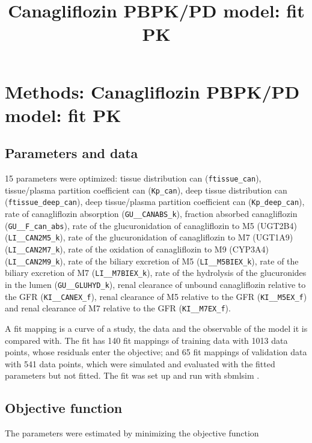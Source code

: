 \documentclass{article}
\title{Canagliflozin PBPK/PD model: fit PK}
\date{}
\begin{document}
\maketitle

\section{Methods: Canagliflozin PBPK/PD model: fit PK}

\subsection{Parameters and data}

15 parameters were optimized: tissue distribution can (\texttt{ftissue\_can}), tissue/plasma partition coefficient can (\texttt{Kp\_can}), deep tissue distribution can (\texttt{ftissue\_deep\_can}), deep tissue/plasma partition coefficient can (\texttt{Kp\_deep\_can}), rate of canagliflozin absorption (\texttt{GU\_\_CANABS\_k}), fraction absorbed canagliflozin (\texttt{GU\_\_F\_can\_abs}), rate of the glucuronidation of canagliflozin to M5 (UGT2B4) (\texttt{LI\_\_CAN2M5\_k}), rate of the glucuronidation of canagliflozin to M7 (UGT1A9) (\texttt{LI\_\_CAN2M7\_k}), rate of the oxidation of canagliflozin to M9 (CYP3A4) (\texttt{LI\_\_CAN2M9\_k}), rate of the biliary excretion of M5 (\texttt{LI\_\_M5BIEX\_k}), rate of the biliary excretion of M7 (\texttt{LI\_\_M7BIEX\_k}), rate of the hydrolysis of the glucuronides in the lumen (\texttt{GU\_\_GLUHYD\_k}), renal clearance of unbound canagliflozin relative to the GFR (\texttt{KI\_\_CANEX\_f}), renal clearance of M5 relative to the GFR (\texttt{KI\_\_M5EX\_f}) and renal clearance of M7 relative to the GFR (\texttt{KI\_\_M7EX\_f}).

A fit mapping is a curve of a study, the data and the observable of the model it is compared with. The fit has 140 fit mappings of training data with 1013 data points, whose residuals enter the objective; and 65 fit mappings of validation data with 541 data points, which were simulated and evaluated with the fitted parameters but not fitted. The fit was set up and run with sbmlsim \cite{Koenig2026_sbmlsim}.

\subsection{Objective function}

The parameters were estimated by minimizing the objective function
\end{document}
